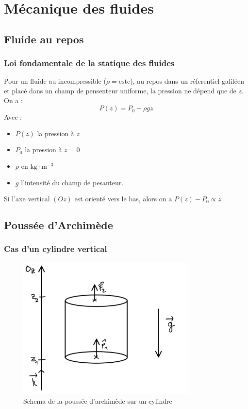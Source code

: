 \chapter{Mécanique des fluides}
\section{Fluide au repos}
\subsection{Loi fondamentale de la statique des fluides}

Pour un fluide au incompressible (\(\rho = \text{cste}\)), au repos dans un réferentiel galiléen et placé dans un champ de pensenteur uniforme, la pression ne dépend que de \(z\). On a : 
\[
    P(z) = P_{0}+\rho gz
\]
Avec :
\begin{itemize}
    \item \(P(z)\) la pression à \(z\)
    \item \(P_{0}\) la pression à \(z=0\) 
    \item \(\rho \) en \(\text{kg} \cdot \text{m}^{-3}\)
    \item \(g\) l'intensité du champ de pesanteur.   
\end{itemize}

\begin{remark}\label{}
    Si l'axe vertical \((Oz)\) est orienté vers le bas, alors on a \(P(z)-P_{0} \propto z\)  
\end{remark}

\section{Poussée d'Archimède}
\subsection{Cas d'un cylindre vertical}

\begin{figure}[!htb]
    \centering
    \includegraphics[width=0.8\textwidth]{SchemaPA.png}
    \caption{Schema de la poussée d'archimède sur un cylindre}
    \label{fig:SchemaPA}
\end{figure}

